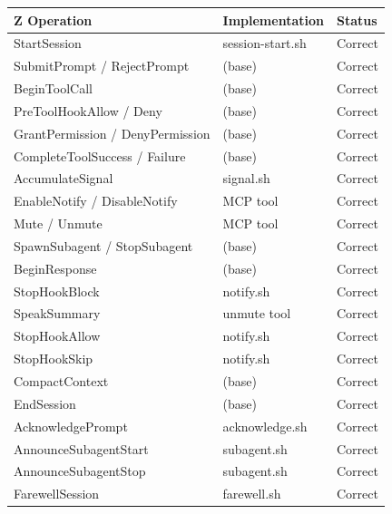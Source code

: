 \documentclass[a4paper,10pt,fleqn]{article}
\begin{document}
\begin{tabular}{lll}
\hline
\textbf{Z Operation} & \textbf{Implementation} & \textbf{Status} \\
\hline
StartSession & session-start.sh & Correct \\
SubmitPrompt / RejectPrompt & (base) & Correct \\
BeginToolCall & (base) & Correct \\
PreToolHookAllow / Deny & (base) & Correct \\
GrantPermission / DenyPermission & (base) & Correct \\
CompleteToolSuccess / Failure & (base) & Correct \\
AccumulateSignal & signal.sh & Correct \\
EnableNotify / DisableNotify & MCP tool & Correct \\
Mute / Unmute & MCP tool & Correct \\
SpawnSubagent / StopSubagent & (base) & Correct \\
BeginResponse & (base) & Correct \\
StopHookBlock & notify.sh & Correct \\
SpeakSummary & unmute tool & Correct \\
StopHookAllow & notify.sh & Correct \\
StopHookSkip & notify.sh & Correct \\
CompactContext & (base) & Correct \\
EndSession & (base) & Correct \\
AcknowledgePrompt & acknowledge.sh & Correct \\
AnnounceSubagentStart & subagent.sh & Correct \\
AnnounceSubagentStop & subagent.sh & Correct \\
FarewellSession & farewell.sh & Correct \\
\hline
\end{tabular}
\end{document}
